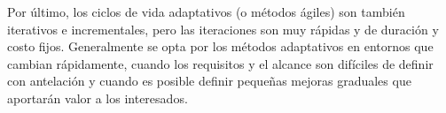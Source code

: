 Por último, los ciclos de vida adaptativos (o métodos ágiles) son también iterativos e incrementales, pero las iteraciones son muy rápidas y de duración y costo fijos. Generalmente se opta por los métodos adaptativos en entornos que cambian rápidamente, cuando los requisitos y el alcance son difíciles de definir con antelación y cuando es posible definir pequeñas mejoras graduales que aportarán valor a los interesados.
